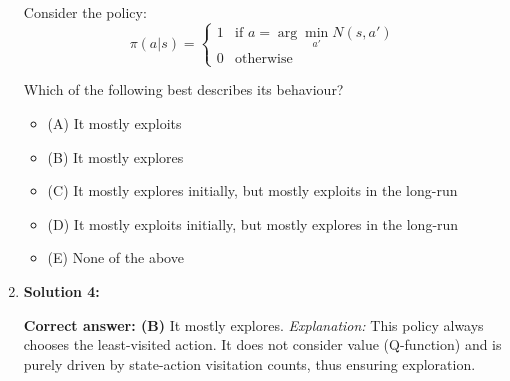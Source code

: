 \begin{example}
\begin{enumerate}
        Consider the policy:
        \[
        \pi(a|s) = 
        \begin{cases}
        1 & \text{if } a = \arg\min_{a'} N(s, a') \\
        0 & \text{otherwise}
        \end{cases}
        \]
    
        Which of the following best describes its behaviour?
        \begin{itemize}
            \item (A) It mostly exploits
            \item (B) It mostly explores
            \item (C) It mostly explores initially, but mostly exploits in the long-run
            \item (D) It mostly exploits initially, but mostly explores in the long-run
            \item (E) None of the above
        \end{itemize}
    
        \item \textbf{Solution 4:}
    
        \textbf{Correct answer: (B)} It mostly explores.  
        \textit{Explanation:} This policy always chooses the least-visited action. It does not consider value (Q-function) and is purely driven by state-action visitation counts, thus ensuring exploration.
    
    \end{enumerate}
\end{example}